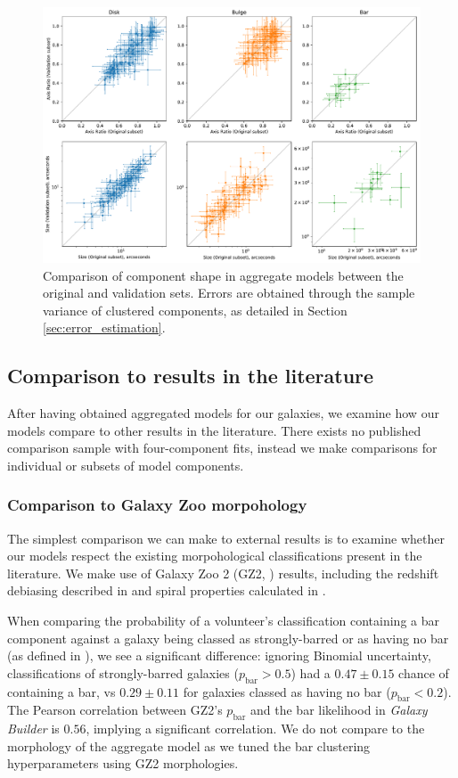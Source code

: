 \documentclass[../main.tex]{subfiles}
\begin{document}
\begin{figure}
  \includegraphics[width=17.3cm]{images__results/component_sizing.pdf}
  \caption{Comparison of component shape in aggregate models between the original and validation sets. Errors are obtained through the sample variance of clustered components, as detailed in Section \ref{sec:error_estimation}.}
  \label{fig:aggregate_model_consistency}
\end{figure}

\subsection{Comparison to results in the literature}

After having obtained aggregated models for our galaxies, we examine how our models compare to other results in the literature. There exists no published comparison sample with four-component fits, instead we make comparisons for individual or subsets of model components.

\subsubsection{Comparison to Galaxy Zoo morpohology}

The simplest comparison we can make to external results is to examine whether our models respect the existing morpohological classifications present in the literature. We make use of Galaxy Zoo 2 (GZ2, \citealt{Willett2013:1308.3496v2}) results, including the redshift debiasing described in \citet{Hart2016:1607.01019v1} and spiral properties calculated in \citet{Hart2016:1607.01019v1}.

When comparing the probability of a volunteer's classification containing a bar component against a galaxy being classed as strongly-barred or as having no bar (as defined in \citealt{Masters2010:1003.0449v2}), we see a significant difference: ignoring Binomial uncertainty, classifications of strongly-barred galaxies ($p_\text{bar} > 0.5$) had a $0.47 \pm 0.15$ chance of containing a bar, vs $0.29 \pm 0.11$ for galaxies classed as having no bar ($p_\text{bar} < 0.2$). The Pearson correlation between GZ2's $p_\text{bar}$ and the bar likelihood in \textit{Galaxy Builder} is $0.56$, implying a significant correlation. We do not compare to the morphology of the aggregate model as we tuned the bar clustering hyperparameters using GZ2 morphologies.
\end{document}
